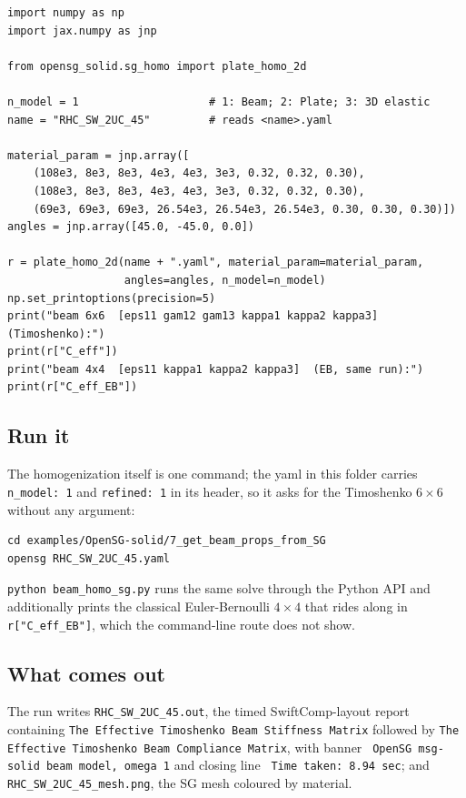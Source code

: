 \begin{lstlisting}[style=opensg,caption={beam\_homo\_sg.py, complete.}]
import numpy as np
import jax.numpy as jnp

from opensg_solid.sg_homo import plate_homo_2d

n_model = 1                    # 1: Beam; 2: Plate; 3: 3D elastic
name = "RHC_SW_2UC_45"         # reads <name>.yaml

material_param = jnp.array([
    (108e3, 8e3, 8e3, 4e3, 4e3, 3e3, 0.32, 0.32, 0.30),
    (108e3, 8e3, 8e3, 4e3, 4e3, 3e3, 0.32, 0.32, 0.30),
    (69e3, 69e3, 69e3, 26.54e3, 26.54e3, 26.54e3, 0.30, 0.30, 0.30)])
angles = jnp.array([45.0, -45.0, 0.0])

r = plate_homo_2d(name + ".yaml", material_param=material_param,
                  angles=angles, n_model=n_model)
np.set_printoptions(precision=5)
print("beam 6x6  [eps11 gam12 gam13 kappa1 kappa2 kappa3]  (Timoshenko):")
print(r["C_eff"])
print("beam 4x4  [eps11 kappa1 kappa2 kappa3]  (EB, same run):")
print(r["C_eff_EB"])
\end{lstlisting}

\subsection{Run it}

The homogenization itself is one command; the yaml in this folder carries
\texttt{n\_model: 1} and \texttt{refined: 1} in its header, so it asks for the
Timoshenko $6\times6$ without any argument:

\begin{lstlisting}[style=shellst]
cd examples/OpenSG-solid/7_get_beam_props_from_SG
opensg RHC_SW_2UC_45.yaml
\end{lstlisting}

\texttt{python beam\_homo\_sg.py} runs the same solve through the Python API
and additionally prints the classical Euler-Bernoulli $4\times4$ that rides
along in \texttt{r["C\_eff\_EB"]}, which the command-line route does not show.

\subsection{What comes out}

The run writes \texttt{RHC\_SW\_2UC\_45.out}, the timed SwiftComp-layout report
containing \texttt{The Effective Timoshenko Beam Stiffness Matrix} followed by
\texttt{The Effective Timoshenko Beam Compliance Matrix}, with banner
\texttt{ OpenSG msg-solid beam model, omega 1} and closing line
\texttt{ Time taken: 8.94 sec}; and \texttt{RHC\_SW\_2UC\_45\_mesh.png}, the SG
mesh coloured by material.

